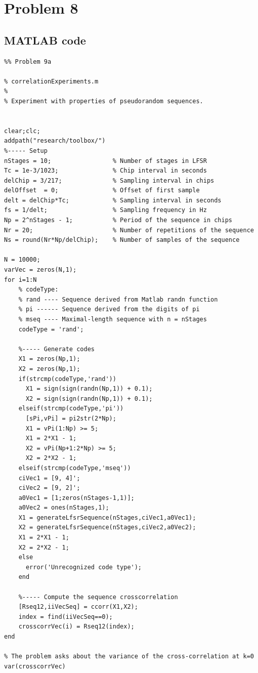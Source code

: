 \section{Problem 8}

\subsection{MATLAB code}

\begin{lstlisting}
%% Problem 9a

% correlationExperiments.m
%
% Experiment with properties of pseudorandom sequences.


clear;clc;
addpath("research/toolbox/")
%----- Setup
nStages = 10;                 % Number of stages in LFSR
Tc = 1e-3/1023;               % Chip interval in seconds
delChip = 3/217;              % Sampling interval in chips
delOffset  = 0;               % Offset of first sample
delt = delChip*Tc;            % Sampling interval in seconds
fs = 1/delt;                  % Sampling frequency in Hz
Np = 2^nStages - 1;           % Period of the sequence in chips
Nr = 20;                      % Number of repetitions of the sequence
Ns = round(Nr*Np/delChip);    % Number of samples of the sequence 

N = 10000;
varVec = zeros(N,1);
for i=1:N
    % codeType:
    % rand ---- Sequence derived from Matlab randn function
    % pi ------ Sequence derived from the digits of pi
    % mseq ---- Maximal-length sequence with n = nStages
    codeType = 'rand';
    
    %----- Generate codes
    X1 = zeros(Np,1);
    X2 = zeros(Np,1);
    if(strcmp(codeType,'rand'))
      X1 = sign(sign(randn(Np,1)) + 0.1);
      X2 = sign(sign(randn(Np,1)) + 0.1);
    elseif(strcmp(codeType,'pi'))
      [sPi,vPi] = pi2str(2*Np);
      X1 = vPi(1:Np) >= 5;
      X1 = 2*X1 - 1;
      X2 = vPi(Np+1:2*Np) >= 5;
      X2 = 2*X2 - 1;
    elseif(strcmp(codeType,'mseq'))
    ciVec1 = [9, 4]';  
    ciVec2 = [9, 2]';
    a0Vec1 = [1;zeros(nStages-1,1)];
    a0Vec2 = ones(nStages,1);
    X1 = generateLfsrSequence(nStages,ciVec1,a0Vec1);
    X2 = generateLfsrSequence(nStages,ciVec2,a0Vec2);
    X1 = 2*X1 - 1;
    X2 = 2*X2 - 1;
    else
      error('Unrecognized code type');
    end
    
    %----- Compute the sequence crosscorrelation
    [Rseq12,iiVecSeq] = ccorr(X1,X2);
    index = find(iiVecSeq==0);
    crosscorrVec(i) = Rseq12(index);
end

% The problem asks about the variance of the cross-correlation at k=0
var(crosscorrVec)
\end{lstlisting}

